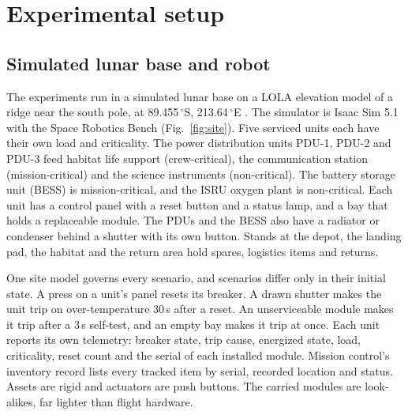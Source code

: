 \providecommand{\TBD}[1]{\textcolor{red}{[TBD: #1]}}

\section{Experimental setup}
\label{sec:setup}

\subsection{Simulated lunar base and robot}
\label{sec:setup-site}

The experiments run in a simulated lunar base on a LOLA elevation model of a ridge near the south pole, at
89.455\,$^\circ$S, 213.64\,$^\circ$E \citep{barker2021lola}. The simulator is Isaac Sim 5.1 with the Space Robotics Bench
\citep{orsula2024srb} (Fig.~\ref{fig:site}). Five serviced units each have their own load and criticality. The power
distribution units PDU-1, PDU-2 and PDU-3 feed habitat life support (crew-critical), the communication station
(mission-critical) and the science instruments (non-critical). The battery storage unit (BESS) is mission-critical, and
the ISRU oxygen plant is non-critical. Each unit has a control panel with a reset button and a status lamp, and a bay
that holds a replaceable module. The PDUs and the BESS also have a radiator or condenser behind a shutter with its own
button. Stands at the depot, the landing pad, the habitat and the return area hold spares, logistics items and returns.

One site model governs every scenario, and scenarios differ only in their initial state. A press on a unit's panel
resets its breaker. A drawn shutter makes the unit trip on over-temperature 30\,s after a reset. An unserviceable module
makes it trip after a 3\,s self-test, and an empty bay makes it trip at once. Each unit reports its own telemetry: breaker
state, trip cause, energized state, load, criticality, reset count and the serial of each installed module. Mission control's inventory record lists every tracked item by serial, recorded
location and status. Assets are rigid and actuators are push buttons. The carried modules are look-alikes, far lighter
than flight hardware.

